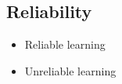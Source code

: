
\subsection*{Reliability}

\begin{itemize}
	\item Reliable learning
	\item Unreliable learning
\end{itemize}